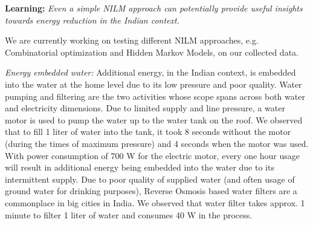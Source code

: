 \documentclass[10pt]{sensys-proc}
\newcommand{\redcolor}[1]{\textcolor{red}{#1}}
\begin{document}
\textbf{Learning:} \emph{Even a simple NILM approach can potentially provide useful insights towards energy reduction in the Indian context.}

We are currently working on testing different NILM approaches, e.g. Combinatorial optimization and Hidden Markov Models, on our collected data.

\emph{Energy embedded water:} Additional energy, in the Indian context, is embedded into the water at the home level due to its low pressure and poor quality. Water pumping and filtering are the two activities whose scope spans across both water and electricity dimensions. Due to limited supply and line pressure, a water motor is used to pump the water up to the water tank on the roof. We observed that to fill 1 liter of water into the tank, it took 8 seconds without the motor (during the times of maximum pressure) and 4 seconds when the motor was used. With power consumption of 700 W for the electric motor, every one hour usage will result in additional energy being embedded into the water due to its intermittent supply. %
Due to poor quality of supplied water (and often usage of ground water for drinking purposes), Reverse Osmosis based water filters are a commonplace in big cities in India. We observed that water filter takes approx. 1 minute to filter 1 liter of water and consumes 40 W in the process. 
\end{document}
